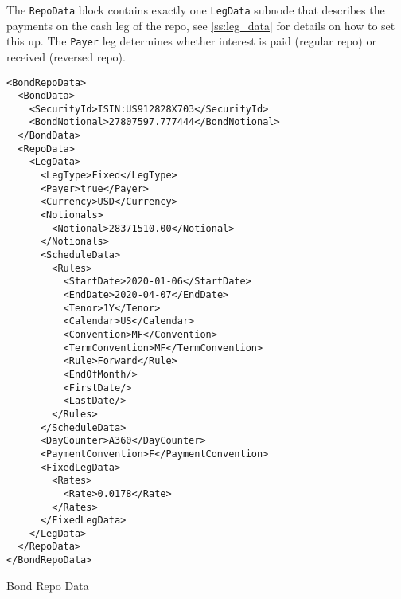 The \verb+RepoData+ block contains exactly one \verb+LegData+ subnode that describes the payments on the cash leg of the
repo, see \ref{ss:leg_data} for details on how to set this up. The \verb+Payer+ leg determines whether interest is paid
(regular repo) or received (reversed repo).

\begin{listing}[H]
\begin{verbatim}
<BondRepoData>
  <BondData>
    <SecurityId>ISIN:US912828X703</SecurityId>
    <BondNotional>27807597.777444</BondNotional>
  </BondData>
  <RepoData>
    <LegData>
      <LegType>Fixed</LegType>
      <Payer>true</Payer>
      <Currency>USD</Currency>
      <Notionals>
        <Notional>28371510.00</Notional>
      </Notionals>
      <ScheduleData>
        <Rules>
          <StartDate>2020-01-06</StartDate>
          <EndDate>2020-04-07</EndDate>
          <Tenor>1Y</Tenor>
          <Calendar>US</Calendar>
          <Convention>MF</Convention>
          <TermConvention>MF</TermConvention>
          <Rule>Forward</Rule>
          <EndOfMonth/>
          <FirstDate/>
          <LastDate/>
        </Rules>
      </ScheduleData>
      <DayCounter>A360</DayCounter>
      <PaymentConvention>F</PaymentConvention>
      <FixedLegData>
        <Rates>
          <Rate>0.0178</Rate>
        </Rates>
      </FixedLegData>
    </LegData>
  </RepoData>
</BondRepoData>
\end{verbatim}
\caption{Bond Repo Data}
\label{lst:bondrepodata}
\end{listing}
